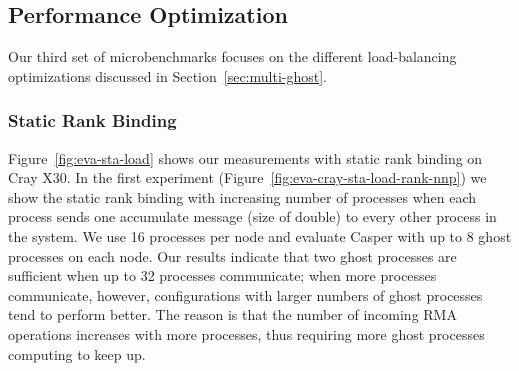 

\subsection{Performance Optimization}\label{sec:eva-load}

Our third set of microbenchmarks focuses on the different load-balancing
optimizations discussed in Section~\ref{sec:multi-ghost}.

\subsubsection{Static Rank Binding}\label{sec:eva-static-rank}

Figure~\ref{fig:eva-sta-load} shows our measurements with static rank
binding on Cray X30.  In the first experiment
(Figure~\ref{fig:eva-cray-sta-load-rank-nnp}) we show the static rank
binding with increasing number of processes when each process sends one
accumulate message (size of double) to every other process in the
system.  We use 16 processes per node and evaluate Casper with up to 8
ghost processes on each node.
Our results indicate that two ghost processes are sufficient
when up to 32 processes communicate; when more processes
communicate, however, configurations with larger numbers of ghost processes tend
to perform better.
The reason is that the number of
incoming RMA operations increases with more processes, thus requiring
more ghost processes computing to keep up.

